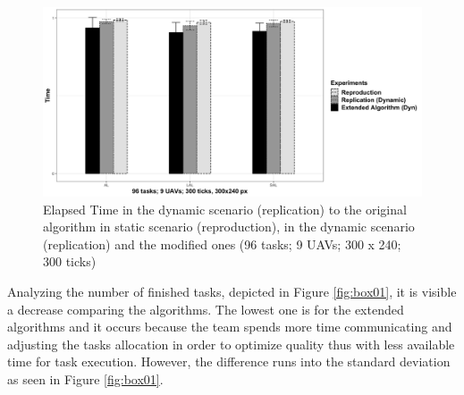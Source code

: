 \begin{figure}[h!]
	\begin{center}
		\includegraphics[scale=0.15]{fig/GRAPH08.png}
		\caption{Elapsed Time  in the dynamic scenario (replication) to the original algorithm in static scenario (reproduction), in the dynamic scenario (replication) and the modified ones (96 tasks; 9 UAVs; 300 x 240; 300 ticks)}
		\label{fig:din02}
	\end{center}
\end{figure}

Analyzing the number of finished tasks, depicted in Figure \ref{fig:box01}, it is visible a decrease comparing the algorithms. The lowest one is for the extended algorithms and it occurs because the team spends more time communicating and adjusting the tasks allocation in order to optimize quality thus with less available time for task execution. However, the difference runs into the standard deviation as seen in Figure \ref{fig:box01}.

